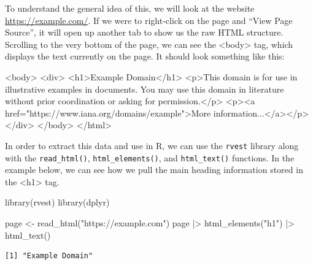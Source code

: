 \documentclass[
  letterpaper,
  DIV=11,
  numbers=noendperiod]{scrreprt}
\newenvironment{Shaded}{\begin{snugshade}}{\end{snugshade}}
\newcommand{\FunctionTok}[1]{\textcolor[rgb]{0.28,0.35,0.67}{#1}}
\newcommand{\NormalTok}[1]{\textcolor[rgb]{0.00,0.23,0.31}{#1}}
\newcommand{\OtherTok}[1]{\textcolor[rgb]{0.00,0.23,0.31}{#1}}
\newcommand{\SpecialCharTok}[1]{\textcolor[rgb]{0.37,0.37,0.37}{#1}}
\newcommand{\StringTok}[1]{\textcolor[rgb]{0.13,0.47,0.30}{#1}}
\begin{document}
To understand the general idea of this, we will look at the website
\url{https://example.com/}. If we were to right-click on the page and
``View Page Source'', it will open up another tab to show us the raw
HTML structure. Scrolling to the very bottom of the page, we can see the
\textless body\textgreater{} tag, which displays the text currently on
the page. It should look something like this:

\begin{Shaded}
\begin{Highlighting}[]
\NormalTok{\textless{}body\textgreater{}}
\NormalTok{\textless{}div\textgreater{}}
\NormalTok{    \textless{}h1\textgreater{}Example Domain\textless{}/h1\textgreater{}}
\NormalTok{    \textless{}p\textgreater{}This domain is for use in illustrative examples in documents. You may use this}
\NormalTok{    domain in literature without prior coordination or asking for permission.\textless{}/p\textgreater{}}
\NormalTok{    \textless{}p\textgreater{}\textless{}a href="https://www.iana.org/domains/example"\textgreater{}More information...\textless{}/a\textgreater{}\textless{}/p\textgreater{}}
\NormalTok{\textless{}/div\textgreater{}}
\NormalTok{\textless{}/body\textgreater{}}
\NormalTok{\textless{}/html\textgreater{}}
\end{Highlighting}
\end{Shaded}

In order to extract this data and use in R, we can use the
\texttt{rvest} library along with the \texttt{read\_html()},
\texttt{html\_elements()}, and \texttt{html\_text()} functions. In the
example below, we can see how we pull the main heading information
stored in the \textless h1\textgreater{} tag.

\begin{Shaded}
\begin{Highlighting}[]
\FunctionTok{library}\NormalTok{(rvest)}
\FunctionTok{library}\NormalTok{(dplyr)}

\NormalTok{page }\OtherTok{\textless{}{-}} \FunctionTok{read\_html}\NormalTok{(}\StringTok{"https://example.com"}\NormalTok{)}
\NormalTok{page }\SpecialCharTok{|\textgreater{}} \FunctionTok{html\_elements}\NormalTok{(}\StringTok{"h1"}\NormalTok{) }\SpecialCharTok{|\textgreater{}} \FunctionTok{html\_text}\NormalTok{()}
\end{Highlighting}
\end{Shaded}

\begin{verbatim}
[1] "Example Domain"
\end{verbatim}
\end{document}
